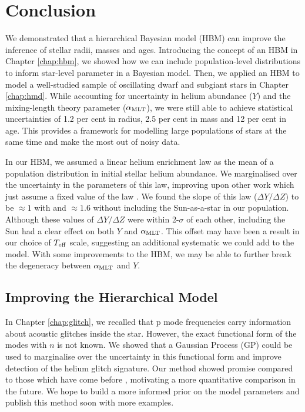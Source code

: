 %
%
%
%
%
\chapter{Conclusion}

We demonstrated that a hierarchical Bayesian model (HBM) can improve the inference of stellar radii, masses and ages. Introducing the concept of an HBM in Chapter \ref{chap:hbm}, we showed how we can include population-level distributions to inform star-level parameter in a Bayesian model. Then, we applied an HBM to model a well-studied sample of oscillating dwarf and subgiant stars in Chapter \ref{chap:hmd}. While accounting for uncertainty in helium abundance (\(Y\)) and the mixing-length theory parameter (\({\alpha_\mathrm{MLT}}\)), we were still able to achieve statistical uncertainties of 1.2 per cent in radius, 2.5 per cent in mass and 12 per cent in age. This provides a framework for modelling large populations of stars at the same time and make the most out of noisy data.

In our HBM, we assumed a linear helium enrichment law as the mean of a population distribution in initial stellar helium abundance. We marginalised over the uncertainty in the parameters of this law, improving upon other work which just assume a fixed value of the law \citep[e.g.][]{Serenelli.Johnson.ea2017}. We found the slope of this law (\(\Delta Y/\Delta Z\)) to be \(\approx 1\) with and \(\approx 1.6\) without including the Sun-as-a-star in our population. Although these values of \(\Delta Y/\Delta Z\) were within 2-\(\sigma\) of each other, including the Sun had a clear effect on both \(Y\) and \({\alpha_\mathrm{MLT}}\). This offset may have been a result in our choice of \({T_\mathrm{eff}}\) scale, suggesting an additional systematic we could add to the model. With some improvements to the HBM, we may be able to further break the degeneracy between \({\alpha_\mathrm{MLT}}\) and \(Y\).

\section{Improving the Hierarchical Model}

In Chapter \ref{chap:glitch}, we recalled that p mode frequencies carry information about acoustic glitches inside the star. However, the exact functional form of the modes with \(n\) is not known. We showed that a Gaussian Process (GP) could be used to marginalise over the uncertainty in this functional form and improve detection of the helium glitch signature. Our method showed promise compared to those which have come before \citep[e.g.][]{Verma.Raodeo.ea2019}, motivating a more quantitative comparison in the future. We hope to build a more informed prior on the model parameters and publish this method soon with more examples.

